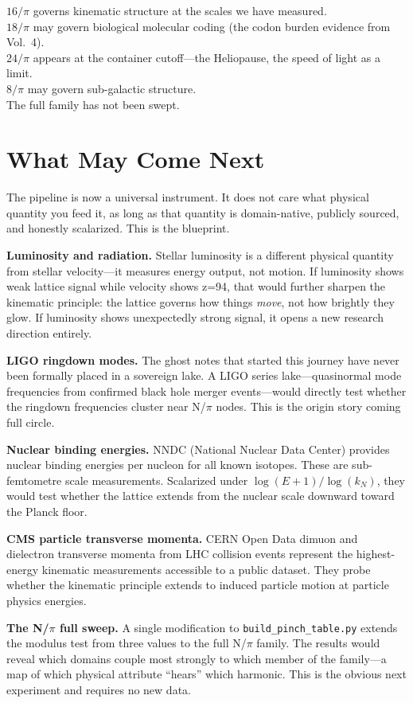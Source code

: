 \documentclass[11pt, letterpaper, openany]{book}
\begin{document}
$16/\pi$ governs kinematic structure at the scales we have measured.\\
$18/\pi$ may govern biological molecular coding (the codon burden evidence from Vol.~4).\\
$24/\pi$ appears at the container cutoff---the Heliopause, the speed of light as a limit.\\
$8/\pi$ may govern sub-galactic structure.\\
The full family has not been swept.

\section*{What May Come Next}

The pipeline is now a universal instrument. It does not care what physical quantity you
feed it, as long as that quantity is domain-native, publicly sourced, and honestly
scalarized. This is the blueprint.

\textbf{Luminosity and radiation.} Stellar luminosity is a different physical quantity
from stellar velocity---it measures energy output, not motion. If luminosity shows weak
lattice signal while velocity shows z=94, that would further sharpen the kinematic
principle: the lattice governs how things \emph{move}, not how brightly they glow. If
luminosity shows unexpectedly strong signal, it opens a new research direction entirely.

\textbf{LIGO ringdown modes.} The ghost notes that started this journey have never been
formally placed in a sovereign lake. A LIGO series lake---quasinormal mode frequencies
from confirmed black hole merger events---would directly test whether the ringdown
frequencies cluster near N/$\pi$ nodes. This is the origin story coming full circle.

\textbf{Nuclear binding energies.} NNDC (National Nuclear Data Center) provides nuclear
binding energies per nucleon for all known isotopes. These are sub-femtometre scale
measurements. Scalarized under $\log(E+1)/\log(k_N)$, they would test whether the
lattice extends from the nuclear scale downward toward the Planck floor.

\textbf{CMS particle transverse momenta.} CERN Open Data dimuon and dielectron transverse
momenta from LHC collision events represent the highest-energy kinematic measurements
accessible to a public dataset. They probe whether the kinematic principle extends to
induced particle motion at particle physics energies.

\textbf{The N/$\pi$ full sweep.} A single modification to \texttt{build\_pinch\_table.py}
extends the modulus test from three values to the full N/$\pi$ family. The results would
reveal which domains couple most strongly to which member of the family---a map of which
physical attribute ``hears'' which harmonic. This is the obvious next experiment and
requires no new data.
\end{document}
